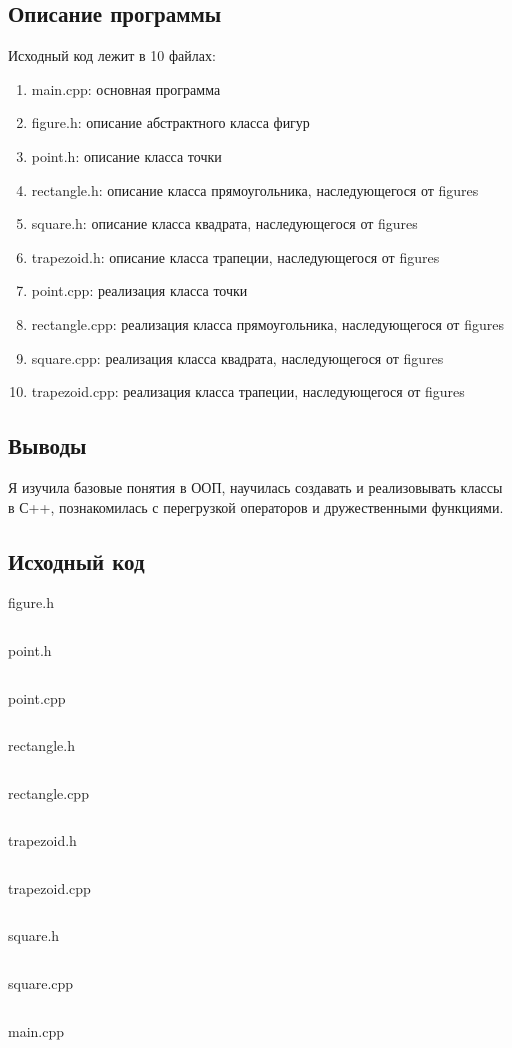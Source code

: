 \documentclass[12pt]{article}
\begin{document}
\subsection*{Описание программы}

Исходный код лежит в 10 файлах:
\begin{enumerate}
\item main.cpp: основная программа

\item figure.h:    описание абстрактного класса фигур

\item point.h:     описание класса точки
\item rectangle.h:  описание класса прямоугольника, наследующегося от figures
\item square.h: описание класса квадрата, наследующегося от figures
\item trapezoid.h:    описание класса трапеции, наследующегося от figures

\item point.cpp:     реализация класса точки
\item rectangle.cpp:  реализация класса прямоугольника, наследующегося от figures
\item square.cpp: реализация класса квадрата, наследующегося от figures
\item trapezoid.cpp:    реализация класса трапеции, наследующегося от figures

\end{enumerate}

\subsection*{Выводы}

Я изучила базовые понятия в ООП, научилась создавать и реализовывать классы в С++, познакомилась с перегрузкой операторов и дружественными функциями.
\pagebreak
    
\subsection*{Исходный код}

{\Huge figure.h}
\inputminted{C++}{figure.h}
    \pagebreak
    
{\Huge point.h}
\inputminted{C++}{point.h}
    \pagebreak

{\Huge point.cpp}
\inputminted{C++}{point.cpp}
    \pagebreak

{\Huge rectangle.h}
\inputminted{C++}{rectangle.h}
\pagebreak

{\Huge rectangle.cpp}
\inputminted{C++}{rectangle.cpp}
\pagebreak

{\Huge trapezoid.h}
\inputminted{C++}{trapezoid.h}
\pagebreak

{\Huge trapezoid.cpp}
\inputminted{C++}{trapezoid.cpp}
\pagebreak

{\Huge square.h}
\inputminted{C++}{square.h}
\pagebreak

{\Huge square.cpp}
\inputminted{C++}{square.cpp}
\pagebreak
    
{\Huge main.cpp}
\inputminted{C++}{main.cpp}
    \pagebreak
\end{document}
